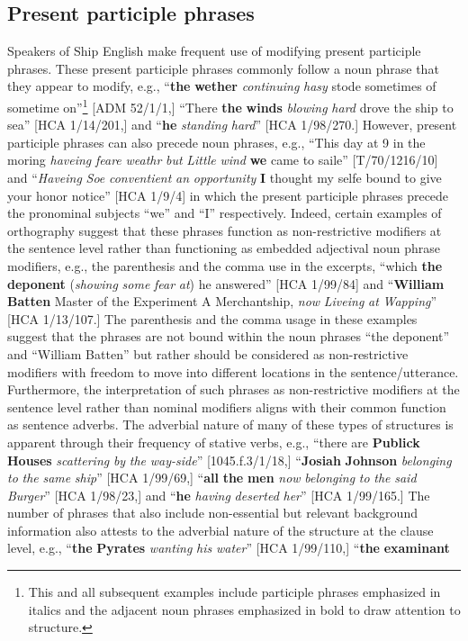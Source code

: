 \subsection{\textbf{Present} \textbf{participle} \textbf{phrases} }%

  Speakers of Ship English make frequent use of modifying present participle phrases. These present participle phrases commonly follow a noun phrase that they appear to modify, e.g., “\textbf{the} \textbf{wether} \textit{continuing} \textit{hasy} stode sometimes of sometime on”\footnote{This and all subsequent examples include participle phrases emphasized in italics and the adjacent noun phrases emphasized in bold to draw attention to structure.} [ADM 52/1/1,] “There \textbf{the} \textbf{winds} \textit{blowing} \textit{hard} drove the ship to sea” [HCA 1/14/201,] and “\textbf{he} \textit{standing} \textit{hard}” [HCA 1/98/270.] However, present participle phrases can also precede noun phrases, e.g., “This day at 9 in the moring \textit{haveing} \textit{feare} \textit{weathr} \textit{but} \textit{Little} \textit{wind} \textbf{we} came to saile” [T/70/1216/10] and “\textit{Haveing} \textit{Soe} \textit{conventient} \textit{an} \textit{opportunity} \textbf{I} thought my selfe bound to give your honor notice” [HCA 1/9/4] in which the present participle phrases precede the pronominal subjects “we” and “I” respectively. Indeed, certain examples of orthography suggest that these phrases function as non-restrictive modifiers at the sentence level rather than functioning as embedded adjectival noun phrase modifiers, e.g., the parenthesis and the comma use in the excerpts, “which \textbf{the} \textbf{deponent} (\textit{showing} \textit{some} \textit{fear} \textit{at}) he answered” [HCA 1/99/84] and “\textbf{William} \textbf{Batten} Master of the Experiment A Merchantship, \textit{now} \textit{Liveing} \textit{at} \textit{Wapping}” [HCA 1/13/107.] The parenthesis and the comma usage in these examples suggest that the phrases are not bound within the noun phrases “the deponent” and “William Batten” but rather should be considered as non-restrictive modifiers with freedom to move into different locations in the sentence/utterance. Furthermore, the interpretation of such phrases as non-restrictive modifiers at the sentence level rather than nominal modifiers aligns with their common function as sentence adverbs. The adverbial nature of many of these types of structures is apparent through their frequency of stative verbs, e.g., “there are \textbf{Publick} \textbf{Houses} \textit{scattering} \textit{by} \textit{the} \textit{way-side}” [1045.f.3/1/18,] “\textbf{Josiah} \textbf{Johnson} \textit{belonging} \textit{to} \textit{the} \textit{same} \textit{ship}” [HCA 1/99/69,] “\textbf{all} \textbf{the} \textbf{men} \textit{now} \textit{belonging} \textit{to} \textit{the} \textit{said} \textit{Burger}” [HCA 1/98/23,] and “\textbf{he} \textit{having} \textit{deserted} \textit{her}” [HCA 1/99/165.] The number of phrases that also include non-essential but relevant background information also attests to the adverbial nature of the structure at the clause level, e.g., “\textbf{the} \textbf{Pyrates} \textit{wanting} \textit{his} \textit{water}” [HCA 1/99/110,] “\textbf{the} \textbf{examinant} 